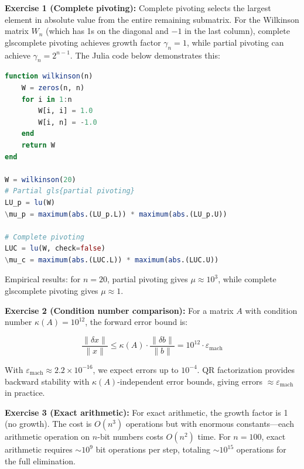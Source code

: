 \begin{solution}
\textbf{Exercise 1 (Complete pivoting):} Complete pivoting selects the largest element in absolute value from the entire remaining submatrix. For the Wilkinson matrix $W_n$ (which has 1s on the diagonal and $-1$ in the last column), complete gls{complete pivoting} achieves growth factor $\gamma_n = 1$, while partial pivoting can achieve $\gamma_n = 2^{n-1}$. The Julia code below demonstrates this:

\begin{lstlisting}[language=Julia]
function wilkinson(n)
    W = zeros(n, n)
    for i in 1:n
        W[i, i] = 1.0
        W[i, n] = -1.0
    end
    return W
end

W = wilkinson(20)
# Partial gls{partial pivoting}
LU_p = lu(W)
\mu_p = maximum(abs.(LU_p.L)) * maximum(abs.(LU_p.U))

# Complete pivoting
LUC = lu(W, check=false)
\mu_c = maximum(abs.(LUC.L)) * maximum(abs.(LUC.U))
\end{lstlisting}

Empirical results: for $n = 20$, partial pivoting gives $\mu \approx 10^3$, while complete gls{complete pivoting} gives $\mu \approx 1$.
\end{solution}

\begin{solution}
\textbf{Exercise 2 (Condition number comparison):} For a matrix $A$ with condition number $\kappa(A) = 10^{12}$, the forward error bound is:

$$\frac{\|\delta x\|}{\|x\|} \leq \kappa(A) \cdot \frac{\|\delta b\|}{\|b\|} = 10^{12} \cdot \varepsilon_{\text{mach}}$$

With $\varepsilon_{\text{mach}} \approx 2.2 \times 10^{-16}$, we expect errors up to $10^{-4}$. QR factorization provides backward stability with $\kappa(A)$-independent error bounds, giving errors $\approx \varepsilon_{\text{mach}}$ in practice.
\end{solution}

\begin{solution}
\textbf{Exercise 3 (Exact arithmetic):} For exact arithmetic, the growth factor is 1 (no growth). The cost is $O(n^3)$ operations but with enormous constants---each arithmetic operation on $n$-bit numbers costs $O(n^2)$ time. For $n = 100$, exact arithmetic requires $\sim 10^9$ bit operations per step, totaling $\sim 10^{15}$ operations for the full elimination.
\end{solution}

